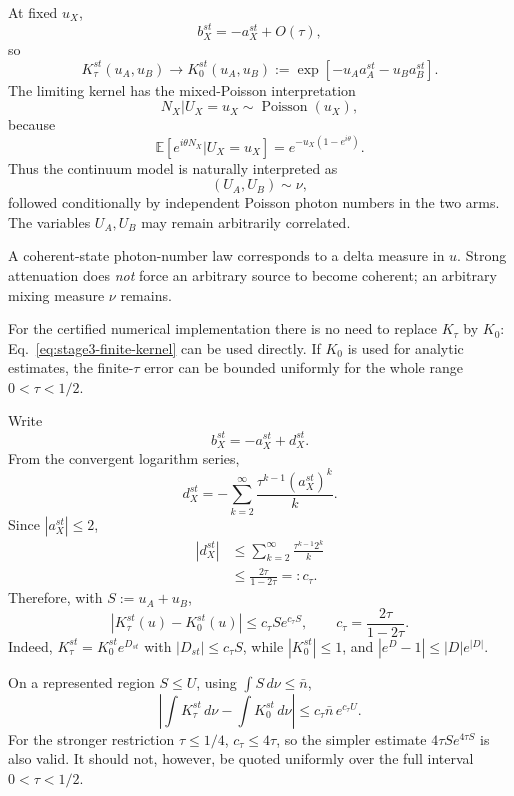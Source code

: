 \documentclass[11pt]{article}
\theoremstyle{remark}
\begin{document}
At fixed \(u_X\),
\[
    b_X^{st}
    =
    -a_X^{st}+O(\tau),
\]
so
\begin{equation}
    K_\tau^{st}(u_A,u_B)
    \longrightarrow
    K_0^{st}(u_A,u_B)
    :=
    \exp[
      -u_Aa_A^{st}
      -u_Ba_B^{st}
    ].
    \label{eq:stage3-limit-kernel}
\end{equation}
The limiting kernel has the mixed-Poisson interpretation
\[
    N_X|U_X=u_X
    \sim
    \operatorname{Poisson}(u_X),
\]
because
\[
    \mathbb E[e^{i\theta N_X}|U_X=u_X]
    =
    e^{-u_X(1-e^{i\theta})}.
\]
Thus the continuum model is naturally interpreted as
\[
    (U_A,U_B)\sim\nu,
\]
followed conditionally by independent Poisson photon numbers in the two arms.
The variables \(U_A,U_B\) may remain arbitrarily correlated.

A coherent-state photon-number law corresponds to a delta measure in \(u\).
Strong attenuation does \emph{not} force an arbitrary source to become
coherent; an arbitrary mixing measure \(\nu\) remains.

For the certified numerical implementation there is no need to replace
\(K_\tau\) by \(K_0\): Eq.~\eqref{eq:stage3-finite-kernel} can be used
directly.  If \(K_0\) is used for analytic estimates, the finite-\(\tau\)
error can be bounded uniformly for the whole range \(0<\tau<1/2\).

Write
\[
    b_X^{st}
    =
    -a_X^{st}
    +
    d_X^{st}.
\]
From the convergent logarithm series,
\[
    d_X^{st}
    =
    -
    \sum_{k=2}^{\infty}
    \frac{
      \tau^{k-1}(a_X^{st})^k
    }{k}.
\]
Since \(|a_X^{st}|\le2\),
\begin{align}
    |d_X^{st}|
    &\le
    \sum_{k=2}^{\infty}
    \frac{
      \tau^{k-1}2^k
    }{k}
    \nonumber\\
    &\le
    \frac{2\tau}{1-2\tau}
    =:
    c_\tau.
    \label{eq:stage3-log-remainder-coeff}
\end{align}
Therefore, with \(S:=u_A+u_B\),
\begin{equation}
    \boxed{
    |K_\tau^{st}(u)-K_0^{st}(u)|
    \le
    c_\tau S e^{c_\tau S},
    \qquad
    c_\tau=\frac{2\tau}{1-2\tau}.
    }
    \label{eq:stage3-pointwise-error}
\end{equation}
Indeed,
\(K_\tau^{st}=K_0^{st}e^{D_{st}}\) with
\(|D_{st}|\le c_\tau S\), while \(|K_0^{st}|\le1\), and
\(|e^D-1|\le |D|e^{|D|}\).

On a represented region \(S\le U\), using
\(\int S\,d\nu\le\bar n\),
\begin{equation}
    \boxed{
    \left|
      \int K_\tau^{st}\,d\nu
      -
      \int K_0^{st}\,d\nu
    \right|
    \le
    c_\tau\bar n\,e^{c_\tau U}.
    }
    \label{eq:stage3-integrated-error}
\end{equation}
For the stronger restriction \(\tau\le1/4\),
\(c_\tau\le4\tau\), so the simpler estimate
\(4\tau S e^{4\tau S}\) is also valid.  It should not, however, be quoted
uniformly over the full interval \(0<\tau<1/2\).
\end{document}
